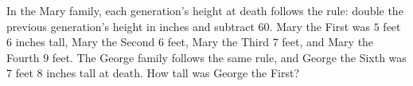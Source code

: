 In the Mary family, each generation's height at death follows the rule: double the previous generation's height in inches and subtract $60$. Mary the First was $5$ feet $6$ inches tall, Mary the Second $6$ feet, Mary the Third $7$ feet, and Mary the Fourth $9$ feet. The George family follows the same rule, and George the Sixth was $7$ feet $8$ inches tall at death. How tall was George the First?
